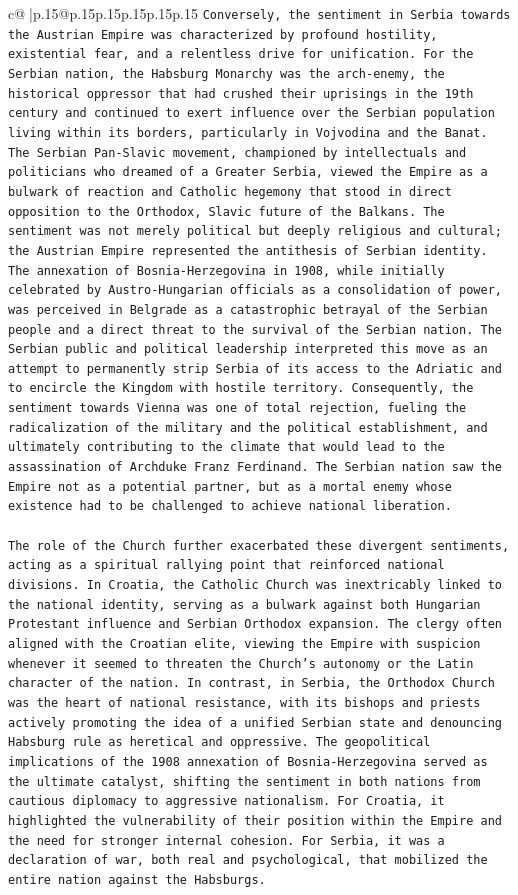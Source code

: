 \documentclass{article}
\begin{document}
{\begin{supertabular}{c@{$\;$}|p{.15\linewidth}@{}p{.15\linewidth}p{.15\linewidth}p{.15\linewidth}p{.15\linewidth}p{.15\linewidth}}
{{{\texttt{Conversely, the sentiment in Serbia towards the Austrian Empire was characterized by profound hostility, existential fear, and a relentless drive for unification. For the Serbian nation, the Habsburg Monarchy was the arch{-}enemy, the historical oppressor that had crushed their uprisings in the 19th century and continued to exert influence over the Serbian population living within its borders, particularly in Vojvodina and the Banat. The Serbian Pan{-}Slavic movement, championed by intellectuals and politicians who dreamed of a Greater Serbia, viewed the Empire as a bulwark of reaction and Catholic hegemony that stood in direct opposition to the Orthodox, Slavic future of the Balkans. The sentiment was not merely political but deeply religious and cultural; the Austrian Empire represented the antithesis of Serbian identity. The annexation of Bosnia{-}Herzegovina in 1908, while initially celebrated by Austro{-}Hungarian officials as a consolidation of power, was perceived in Belgrade as a catastrophic betrayal of the Serbian people and a direct threat to the survival of the Serbian nation. The Serbian public and political leadership interpreted this move as an attempt to permanently strip Serbia of its access to the Adriatic and to encircle the Kingdom with hostile territory. Consequently, the sentiment towards Vienna was one of total rejection, fueling the radicalization of the military and the political establishment, and ultimately contributing to the climate that would lead to the assassination of Archduke Franz Ferdinand. The Serbian nation saw the Empire not as a potential partner, but as a mortal enemy whose existence had to be challenged to achieve national liberation.} \\
\\ 
\texttt{The role of the Church further exacerbated these divergent sentiments, acting as a spiritual rallying point that reinforced national divisions. In Croatia, the Catholic Church was inextricably linked to the national identity, serving as a bulwark against both Hungarian Protestant influence and Serbian Orthodox expansion. The clergy often aligned with the Croatian elite, viewing the Empire with suspicion whenever it seemed to threaten the Church's autonomy or the Latin character of the nation. In contrast, in Serbia, the Orthodox Church was the heart of national resistance, with its bishops and priests actively promoting the idea of a unified Serbian state and denouncing Habsburg rule as heretical and oppressive. The geopolitical implications of the 1908 annexation of Bosnia{-}Herzegovina served as the ultimate catalyst, shifting the sentiment in both nations from cautious diplomacy to aggressive nationalism. For Croatia, it highlighted the vulnerability of their position within the Empire and the need for stronger internal cohesion. For Serbia, it was a declaration of war, both real and psychological, that mobilized the entire nation against the Habsburgs.} \\
}}}
\end{supertabular}}
\end{document}
